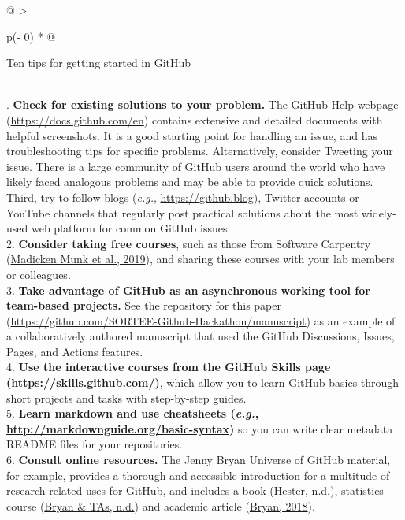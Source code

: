 \begin{tablenos:no-prefix-table-caption}

\begin{longtable}[]{@{}
  >{\raggedright\arraybackslash}p{(\columnwidth - 0\tabcolsep) * }@{}}
\toprule
\begin{minipage}[b]{\linewidth}\raggedright
Ten tips for getting started in GitHub
\end{minipage} \\
\midrule
{}. \textbf{Check for existing solutions to your problem.} The GitHub Help webpage (\url{https://docs.github.com/en}) contains extensive and detailed documents with helpful screenshots. It is a good starting point for handling an issue, and has troubleshooting tips for specific problems. Alternatively, consider Tweeting your issue. There is a large community of GitHub users around the world who have likely faced analogous problems and may be able to provide quick solutions. Third, try to follow blogs (\emph{e.g.}, \url{https://github.blog}), Twitter accounts or YouTube channels that regularly post practical solutions about the most widely-used web platform for common GitHub issues. \\
2. \textbf{Consider taking free courses}, such as those from Software Carpentry (\protect\hyperlink{ref-pjy75gHr}{Madicken Munk et al., 2019}), and sharing these courses with your lab members or colleagues. \\
3. \textbf{Take advantage of GitHub as an asynchronous working tool for team-based projects.} See the repository for this paper (\url{https://github.com/SORTEE-Github-Hackathon/manuscript}) as an example of a collaboratively authored manuscript that used the GitHub Discussions, Issues, Pages, and Actions features. \\
4. \textbf{Use the interactive courses from the GitHub Skills page (\url{https://skills.github.com/})}, which allow you to learn GitHub basics through short projects and tasks with step-by-step guides. \\
5. \textbf{Learn markdown and use cheatsheets (\emph{e.g.}, \url{http://markdownguide.org/basic-syntax})} so you can write clear metadata README files for your repositories. \\
6. \textbf{Consult online resources.} The Jenny Bryan Universe of GitHub material, for example, provides a thorough and accessible introduction for a multitude of research-related uses for GitHub, and includes a book (\protect\hyperlink{ref-ZvrOcg9w}{Hester, n.d.}), statistics course (\protect\hyperlink{ref-6CMMeSeD}{Bryan \& TAs, n.d.}) and academic article (\protect\hyperlink{ref-RVetqmsg}{Bryan, 2018}). \\

\end{longtable}
\end{tablenos:no-prefix-table-caption}
